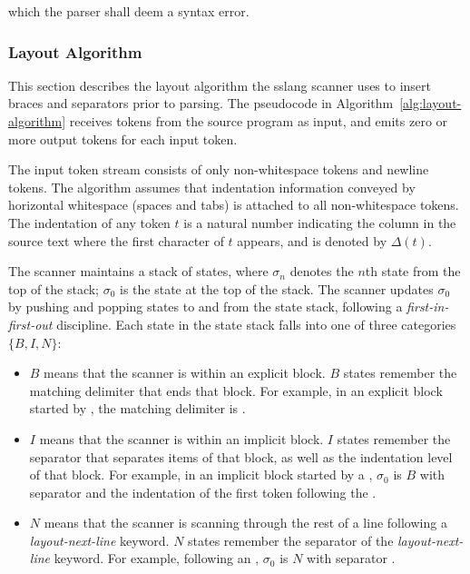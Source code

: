 \documentclass{article}
\begin{document}
which the parser shall deem a syntax error.

\subsubsection{Layout Algorithm}

This section describes the layout algorithm the sslang scanner uses
to insert braces and separators prior to parsing.
The pseudocode in Algorithm~\ref{alg:layout-algorithm} receives tokens from the
source program as input, and emits zero or more output tokens for each input
token.

The input token stream consists of only non-whitespace tokens and newline tokens.
The algorithm assumes that indentation information conveyed by horizontal
whitespace (spaces and tabs) is attached to all non-whitespace tokens.
The indentation of any token $t$ is a natural number indicating the column in
the source text where the first character of $t$ appears, and is denoted by
$\Delta(t)$.

The scanner maintains a stack of states, where $\sigma_n$ denotes the $n$th
state from the top of the stack;
$\sigma_0$ is the state at the top of the stack.
The scanner updates $\sigma_0$ by pushing and popping states to and from the
state stack, following a \emph{first-in-first-out} discipline.
Each state in the state stack falls into one of three categories $\{ B, I, N \}$:

\begin{itemize}
  \item $B$ means that the scanner is within an explicit block.
    $B$ states remember the matching delimiter that ends that block.
    For example, in an explicit block started by \lit*{(}, the matching delimiter is \lit*{)}.

  \item $I$ means that the scanner is within an implicit block.
    $I$ states remember the separator that separates items of that block, as
    well as the indentation level of that block.
    For example, in an implicit block started by a , $\sigma_0$ is $B$
    with separator \lit*{||} and the indentation of the first token following the .

  \item $N$ means that the scanner is scanning through the rest of a line
    following a \emph{layout-next-line} keyword.
    $N$ states remember the separator of the \emph{layout-next-line} keyword.
    For example, following an , $\sigma_0$ is $N$ with separator \lit*{;}.
\end{itemize}
\end{document}
